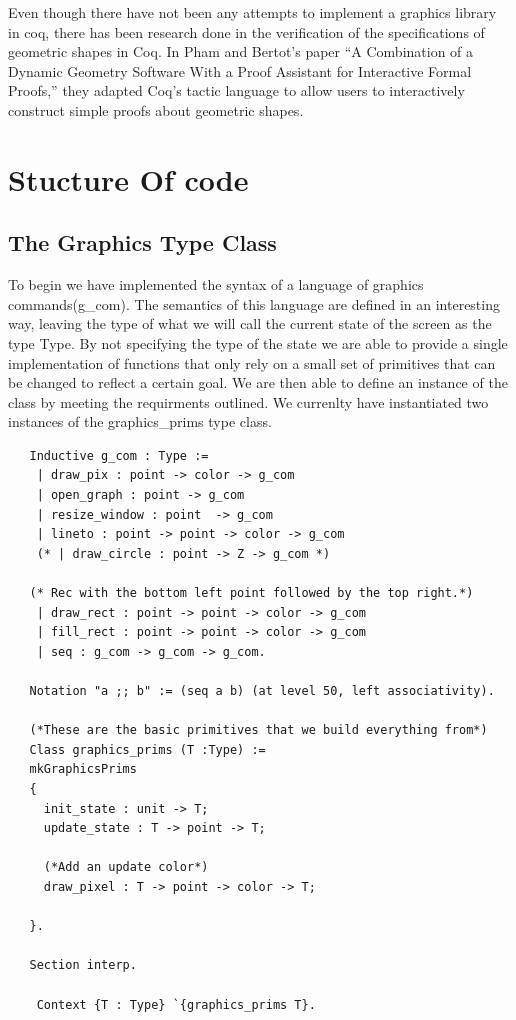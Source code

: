 \documentclass{llncs}
\begin{document}
Even though there have not been any attempts to implement a graphics library
in coq, there has been research done in the verification of the specifications of
geometric shapes in Coq. In Pham and Bertot’s paper “A Combination of a 
Dynamic Geometry Software With a Proof Assistant for Interactive Formal Proofs,”
\cite{geo} they adapted Coq’s tactic language to allow users to interactively
construct simple proofs about geometric shapes.



\section{Stucture Of code}

\subsection{The Graphics Type Class}
 To begin we have implemented the syntax of a language of graphics commands(g\_com). The semantics of this language are defined in an interesting way, leaving the type of what we will call the current state of the screen as the type Type.  By not specifying the type of the state we are able to
 provide a single implementation of functions that only rely on a small set of primitives that can be changed to reflect a certain goal. We are then able to define an instance of the class by meeting the requirments outlined. We currenlty have instantiated two instances of the graphics\_prims type class. \cite{class}

\begin{lstlisting}
   Inductive g_com : Type :=
    | draw_pix : point -> color -> g_com
    | open_graph : point -> g_com
    | resize_window : point  -> g_com
    | lineto : point -> point -> color -> g_com
    (* | draw_circle : point -> Z -> g_com *)

   (* Rec with the bottom left point followed by the top right.*)          
    | draw_rect : point -> point -> color -> g_com
    | fill_rect : point -> point -> color -> g_com
    | seq : g_com -> g_com -> g_com.

   Notation "a ;; b" := (seq a b) (at level 50, left associativity).

   (*These are the basic primitives that we build everything from*)
   Class graphics_prims (T :Type) :=
   mkGraphicsPrims
   {
     init_state : unit -> T;
     update_state : T -> point -> T;

     (*Add an update color*)
     draw_pixel : T -> point -> color -> T;

   }.

   Section interp.

    Context {T : Type} `{graphics_prims T}.
  \end{lstlisting}
\end{document}
